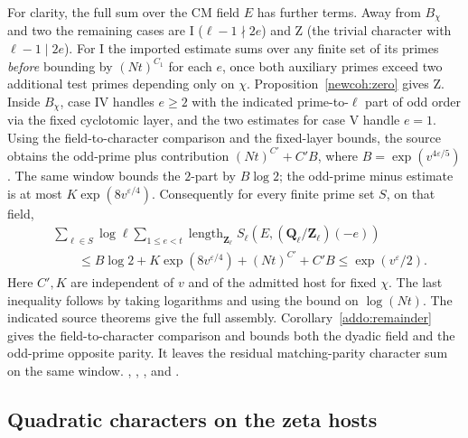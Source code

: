 For clarity, the full sum over the CM field \(E\) has further terms.
Away from \(B_\chi\) and two the remaining cases are I
(\(\ell-1\nmid2e\)) and Z (the trivial character with
\(\ell-1\mid2e\)). For I the imported estimate sums over any finite
set of its primes \emph{before} bounding by \((Nt)^{C_1}\) for each
\(e\), once both auxiliary primes exceed two additional test primes
depending only on \(\chi\). Proposition~\ref{newcoh:zero} gives Z.
Inside \(B_\chi\), case IV handles \(e\ge2\) with the indicated
prime-to-\(\ell\) part of odd order via the fixed cyclotomic layer,
and the two estimates for case V handle \(e=1\).
Using the field-to-character comparison and the fixed-layer bounds,
the source obtains the odd-prime plus contribution
\((Nt)^{C'}+C'B\), where \(B=\exp(v^{4\varepsilon/5})\).
The same window bounds the \(2\)-part by \(B\log2\); the odd-prime
minus estimate is at most \(K\exp(8v^{\varepsilon/4})\).
Consequently for every finite prime set \(S\), on that field,
\[
 \begin{aligned}
 &\sum_{\ell\in S}\log\ell\sum_{1\le e<t}
      \operatorname{length}_{\mathbf Z_\ell}
      S_\ell(E,(\mathbf Q_\ell/\mathbf Z_\ell)(-e))\\
 &\qquad\le B\log2+K\exp(8v^{\varepsilon/4})+(Nt)^{C'}+C'B
       \le \exp(v^\varepsilon/2).
 \end{aligned}
\]
Here \(C',K\) are independent of \(v\) and of the admitted host for
fixed \(\chi\). The last inequality follows by taking logarithms
and using the bound on \(\log(Nt)\). The indicated source theorems
give the full assembly. Corollary~\ref{addo:remainder} gives the
field-to-character comparison and bounds both the dyadic field and
the odd-prime opposite parity. It leaves the residual matching-parity
character sum on the same window.
,
,
, and
.

\subsection{Quadratic characters on the zeta hosts}\label{famsel:quadraticpage}

